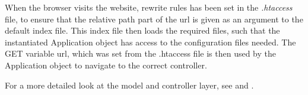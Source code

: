 \begin{description}[style=nextline]
	\item[Application]
	When the browser visits the website, rewrite rules has been set in the \textit{.htaccess} file, to ensure that the relative path part of the url is given as an argument to the default index file. This index file then loads the required files, such that the instantiated Application object has access to the configuration files needed.
	The GET variable url, which was set from the .htaccess file is then used by the Application object to navigate to the correct controller.
	
	
\end{description}

For a more detailed look at the model and controller layer, see  and .